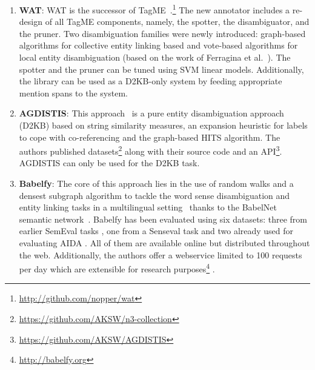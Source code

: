 \begin{enumerate}
\item \textbf{WAT}: WAT is the successor of TagME~\cite{TagMe2}.\footnote{\url{http://github.com/nopper/wat}}
The new annotator includes a re-design of all TagME components, namely, the spotter, the disambiguator, and the pruner. 
Two disambiguation families were newly introduced: graph-based algorithms for collective entity linking based %
and vote-based algorithms for local entity disambiguation (based on the work of Ferragina et al.~\cite{TagMe2}). 
The spotter and the pruner can be tuned using SVM linear models. 
Additionally, the library can be used as a D2KB-only system by feeding appropriate mention spans to the system. 

\item \textbf{AGDISTIS}: This approach~\cite{AGDISTIS_ISWC} is a pure entity disambiguation approach (D2KB) based on string similarity measures, an expansion heuristic for labels to cope with co-referencing and the graph-based HITS algorithm.
The authors published datasets\footnote{\url{https://github.com/AKSW/n3-collection}} along with their source code and an API\footnote{\url{https://github.com/AKSW/AGDISTIS}}.
AGDISTIS can only be used for the D2KB task.

\item \textbf{Babelfy}: The core of this approach lies in the use of random walks and a densest subgraph algorithm to tackle the word sense disambiguation and entity linking tasks in a multilingual setting~\cite{babelfy} thanks to the BabelNet semantic network~\cite{NavigliPonzetto:12aij}.
Babelfy has been evaluated using six datasets: three from earlier SemEval tasks \cite{pradhan2007semeval,NavigliLH:2007,Naviglietal:13}, one from a Senseval task \cite{snyder2004english} and two already used for evaluating AIDA \cite{AIDA,HoffartSNTW:2012}.
All of them are available online but distributed throughout the web. 
Additionally, the authors offer a webservice limited to 100 requests per day which are extensible for research purposes\footnote{\url{http://babelfy.org}} \cite{BabelfyAPI}.


\end{enumerate}
